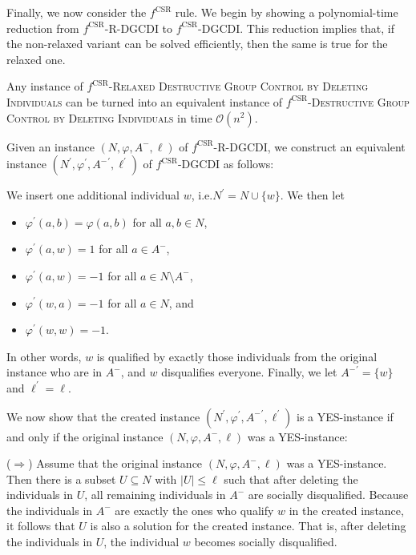 \documentclass[
    12pt,               %
    a4paper,            %
    bibtotoc,           %
    pointlessnumbers,   %
    ngerman,            %
    titlepage,          %
    leqno,              %
    ]{scrarticle}       %
\begin{document}
Finally, we now consider the $f^{\text{CSR}}$ rule. We begin by showing a polynomial-time reduction from $f^{\text{CSR}}$-R-DGCDI to $f^{\text{CSR}}$-DGCDI. This reduction implies that, if the non-relaxed variant can be solved efficiently, then the same is true for the relaxed one.

\begin{Observation} \label{obs:csr_rdgcdi_reduction_dgcdi}
Any instance of $f^{\text{CSR}}$-\textsc{Relaxed Destructive Group Control by Deleting Individuals} can be turned into an equivalent instance of $f^{\text{CSR}}$-\textsc{Destructive Group Control by Deleting Individuals} in time $\mathcal{O}(n^2)$.
\end{Observation}

\begin{Proof}
Given an instance $(N, \varphi, A^-, \ell)$ of $f^{\text{CSR}}$-R-DGCDI, we construct an equivalent instance $(N^\prime, \varphi^\prime, {A^-}^\prime, \ell^\prime)$ of $f^{\text{CSR}}$-DGCDI as follows:

We insert one additional individual $w$, i.e.\@ $N^\prime = N \cup \{w\}$. We then let

\begin{itemize}[nolistsep, topsep=-1.25em]
\item
$\varphi^\prime(a, b) = \varphi(a, b)$ for all $a, b \in N$,
\item
$\varphi^\prime(a, w) = 1$ for all $a \in A^-$,
\item
$\varphi^\prime(a, w) = -1$ for all $a \in N \setminus A^-$,
\item
$\varphi^\prime(w, a) = -1$ for all $a \in N$, and
\item
$\varphi^\prime(w, w) = -1$.
\end{itemize}

In other words, $w$ is qualified by exactly those individuals from the original instance who are in $A^-$, and $w$ disqualifies everyone. Finally, we let ${A^-}^\prime = \{w\}$ and $\ell^\prime = \ell$.

We now show that the created instance $(N^\prime, \varphi^\prime, {A^-}^\prime, \ell^\prime)$ is a YES-instance if and only if the original instance $(N, \varphi, A^-, \ell)$ was a YES-instance:

($\Rightarrow$) Assume that the original instance $(N, \varphi, A^-, \ell)$ was a YES-instance. Then there is a subset $U \subseteq N$ with $|U| \leq \ell$ such that after deleting the individuals in $U$, all remaining individuals in $A^-$ are socially disqualified. Because the individuals in $A^-$ are exactly the ones who qualify $w$ in the created instance, it follows that $U$ is also a solution for the created instance. That is, after deleting the individuals in $U$, the individual $w$ becomes socially disqualified.


\end{Proof}
\end{document}
